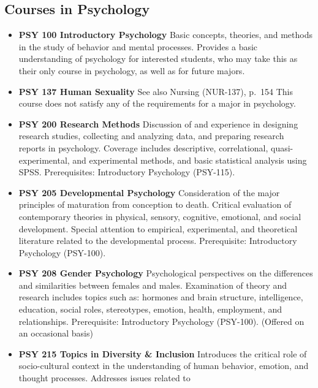 \documentclass[
  letterpaper,
]{scrbook}
\providecommand{\tightlist}{%
  \setlength{\itemsep}{0pt}\setlength{\parskip}{0pt}}
\begin{document}
\hypertarget{courses-in-psychology}{%
\subsection{Courses in Psychology}\label{courses-in-psychology}}

\begin{itemize}
\tightlist
\item
  \textbf{PSY 100 Introductory Psychology} Basic concepts, theories, and
  methods in the study of behavior and mental processes. Provides a
  basic understanding of psychology for interested students, who may
  take this as their only course in psychology, as well as for future
  majors.\\
\item
  \textbf{PSY 137 Human Sexuality} See also Nursing (NUR-137), p.~154
  This course does not satisfy any of the requirements for a major in
  psychology.
\item
  \textbf{PSY 200 Research Methods} Discussion of and experience in
  designing research studies, collecting and analyzing data, and
  preparing research reports in psychology. Coverage includes
  descriptive, correlational, quasi-experimental, and experimental
  methods, and basic statistical analysis using SPSS. Prerequisites:
  Introductory Psychology (PSY-115).\\
\item
  \textbf{PSY 205 Developmental Psychology} Consideration of the major
  principles of maturation from conception to death. Critical evaluation
  of contemporary theories in physical, sensory, cognitive, emotional,
  and social development. Special attention to empirical, experimental,
  and theoretical literature related to the developmental process.
  Prerequisite: Introductory Psychology (PSY-100).
\item
  \textbf{PSY 208 Gender Psychology} Psychological perspectives on the
  differences and similarities between females and males. Examination of
  theory and research includes topics such as: hormones and brain
  structure, intelligence, education, social roles, stereotypes,
  emotion, health, employment, and relationships. Prerequisite:
  Introductory Psychology (PSY-100). (Offered on an occasional basis)\\
\item
  \textbf{PSY 215 Topics in Diversity \& Inclusion} Introduces the
  critical role of socio-cultural context in the understanding of human
  behavior, emotion, and thought processes. Addresses issues related to

\end{itemize}
\end{document}
